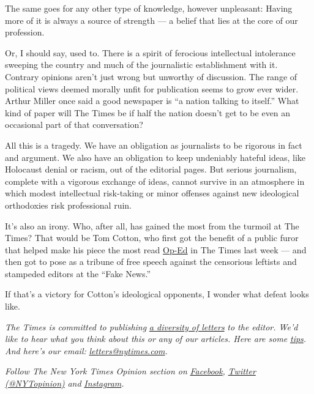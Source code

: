 The same goes for any other type of knowledge, however unpleasant:
Having more of it is always a source of strength --- a belief that lies
at the core of our profession.

Or, I should say, used to. There is a spirit of ferocious intellectual
intolerance sweeping the country and much of the journalistic
establishment with it. Contrary opinions aren't just wrong but unworthy
of discussion. The range of political views deemed morally unfit for
publication seems to grow ever wider. Arthur Miller once said a good
newspaper is ``a nation talking to itself.'' What kind of paper will The
Times be if half the nation doesn't get to be even an occasional part of
that conversation?

All this is a tragedy. We have an obligation as journalists to be
rigorous in fact and argument. We also have an obligation to keep
undeniably hateful ideas, like Holocaust denial or racism, out of the
editorial pages. But serious journalism, complete with a vigorous
exchange of ideas, cannot survive in an atmosphere in which modest
intellectual risk-taking or minor offenses against new ideological
orthodoxies risk professional ruin.

It's also an irony. Who, after all, has gained the most from the turmoil
at The Times? That would be Tom Cotton, who first got the benefit of a
public furor that helped make his piece the most read
\href{https://www.nytimes.com/2020/06/03/opinion/tom-cotton-protests-military.html}{Op-Ed}
in The Times last week --- and then got to pose as a tribune of free
speech against the censorious leftists and stampeded editors at the
``Fake News.''

If that's a victory for Cotton's ideological opponents, I wonder what
defeat looks like.

\emph{The Times is committed to publishing}
\href{https://www.nytimes.com/2019/01/31/opinion/letters/letters-to-editor-new-york-times-women.html}{\emph{a
diversity of letters}} \emph{to the editor. We'd like to hear what you
think about this or any of our articles. Here are some}
\href{https://help.nytimes.com/hc/en-us/articles/115014925288-How-to-submit-a-letter-to-the-editor}{\emph{tips}}\emph{.
And here's our email:}
\href{mailto:letters@nytimes.com}{\emph{letters@nytimes.com}}\emph{.}

\emph{Follow The New York Times Opinion section on}
\href{https://www.facebook.com/nytopinion}{\emph{Facebook}}\emph{,}
\href{http://twitter.com/NYTOpinion}{\emph{Twitter (@NYTopinion)}}
\emph{and}
\href{https://www.instagram.com/nytopinion/}{\emph{Instagram}}\emph{.}

